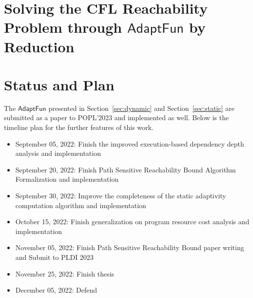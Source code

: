 \documentclass[a4paper,11pt]{article}
\newcommand{\THESYSTEM}{\textsf{AdaptFun}}
\begin{document}
\section{Solving the CFL Reachability Problem through $\THESYSTEM$ by Reduction}
\label{sec:cfl_reduction}


\section{Status and Plan}
The $\THESYSTEM$ presented in Section~\ref{sec:dynamic} and Section~\ref{sec:static} are submitted as a paper to POPL'2023 and implemented as well. Below is the timeline plan for the further features of this work.
\begin{itemize}
\item September 05, 2022: Finish the improved execution-based dependency depth analysis and implementation
\item September 20, 2022: Finish Path Sensitive Reachability Bound Algorithm Formalization and implementation
\item September 30, 2022: Improve the completeness of the static adaptivity computation algorithm and implementation
\item October 15, 2022:  Finish generalization on program resource cost analysis and implementation
\item November 05, 2022: Finish Path Sensitive Reachability Bound paper writing and Submit to PLDI 2023
\item November 25, 2022: Finish thesis
\item December 05, 2022: Defend
\end{itemize}




\end{document}
